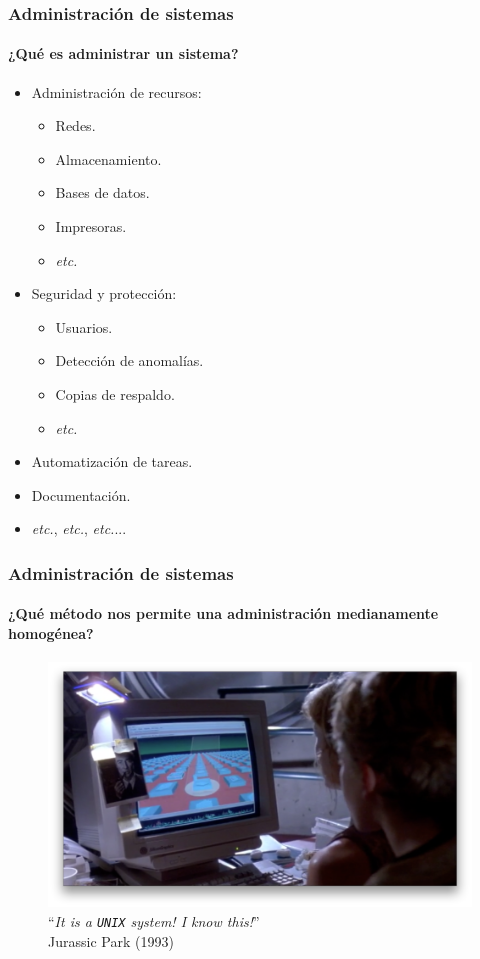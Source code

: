 \documentclass[11pt,a4paper,spanish]{beamer}
\begin{document}
\begin{frame}

    \frametitle{Administración de sistemas}
    \framesubtitle{¿Qué es administrar un sistema?}

\begin{itemize}
    \item Administración de recursos:
        \begin{itemize}
            \item Redes.
            \item Almacenamiento.
            \item Bases de datos.
            \item Impresoras.
            \item \emph{etc.}
        \end{itemize}
    \item Seguridad y protección:
        \begin{itemize}
            \item Usuarios.
            \item Detección de anomalías.
            \item Copias de respaldo.
            \item \emph{etc.}
        \end{itemize}
    \item Automatización de tareas.
    \item Documentación.
    \item \emph{etc.}, \emph{etc.}, \emph{etc.}...
\end{itemize}

\end{frame}

\begin{frame}

    \frametitle{Administración de sistemas}
    \framesubtitle{¿Qué método nos permite una administración medianamente
    homogénea?}

    \begin{figure}
    \centering
    \includegraphics[height=0.80\textheight]{img/jurassicPark.png}
        \captionsetup{textfont=tiny,labelformat=empty}
        \caption{``\emph{It is a \texttt{UNIX} system! I know this!}''\\
        Jurassic Park (1993)}
    \end{figure}
\end{frame}
\end{document}
